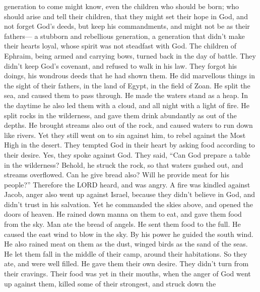 generation to come might know, even the children who should be born; who
should arise and tell their children,  that they might set
their hope in God, and not forget God's deeds, but keep his
commandments,  and might not be as their fathers--- a
stubborn and rebellious generation, a generation that didn't make their
hearts loyal, whose spirit was not steadfast with God. 
The children of Ephraim, being armed and carrying bows, turned back in
the day of battle.  They didn't keep God's covenant, and
refused to walk in his law.  They forgot his doings, his
wondrous deeds that he had shown them.  He did marvellous
things in the sight of their fathers, in the land of Egypt, in the field
of Zoan.  He split the sea, and caused them to pass
through. He made the waters stand as a heap.  In the
daytime he also led them with a cloud, and all night with a light of
fire.  He split rocks in the wilderness, and gave them
drink abundantly as out of the depths.  He brought
streams also out of the rock, and caused waters to run down like rivers.
 Yet they still went on to sin against him, to rebel
against the Most High in the desert.  They tempted God in
their heart by asking food according to their desire. 
Yes, they spoke against God. They said, ``Can God prepare a table in the
wilderness?  Behold, he struck the rock, so that waters
gushed out, and streams overflowed. Can he give bread also? Will he
provide meat for his people?''  Therefore the LORD heard,
and was angry. A fire was kindled against Jacob, anger also went up
against Israel,  because they didn't believe in God, and
didn't trust in his salvation.  Yet he commanded the
skies above, and opened the doors of heaven.  He rained
down manna on them to eat, and gave them food from the sky.
 Man ate the bread of angels. He sent them food to the
full.  He caused the east wind to blow in the sky. By his
power he guided the south wind.  He also rained meat on
them as the dust, winged birds as the sand of the seas. 
He let them fall in the middle of their camp, around their habitations.
 So they ate, and were well filled. He gave them their
own desire.  They didn't turn from their cravings. Their
food was yet in their mouths,  when the anger of God went
up against them, killed some of their strongest, and struck down the

